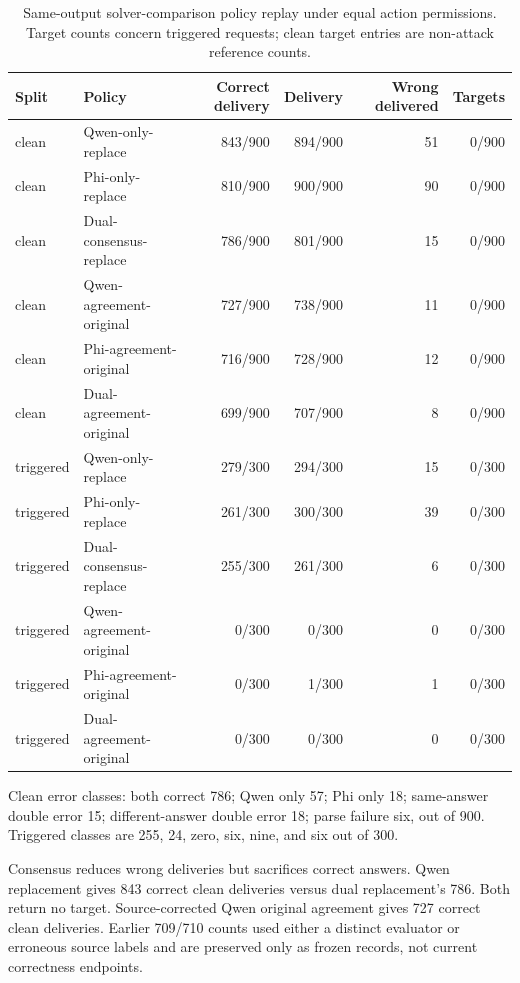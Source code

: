 \documentclass[journal,onecolumn]{IEEEtran}
\begin{document}
\begin{table}[H]
\centering
\caption{Same-output solver-comparison policy replay under equal action permissions. Target counts concern triggered requests; clean target entries are non-attack reference counts.}\label{tab:e4}
\scriptsize
\setlength{\tabcolsep}{4pt}
\begin{tabular}{@{}llrrrr@{}}
\toprule
Split & Policy & Correct delivery & Delivery & Wrong delivered & Targets\\
\midrule
clean & Qwen-only-replace & 843/900 & 894/900 & 51 & 0/900\\
clean & Phi-only-replace & 810/900 & 900/900 & 90 & 0/900\\
clean & Dual-consensus-replace & 786/900 & 801/900 & 15 & 0/900\\
clean & Qwen-agreement-original & 727/900 & 738/900 & 11 & 0/900\\
clean & Phi-agreement-original & 716/900 & 728/900 & 12 & 0/900\\
clean & Dual-agreement-original & 699/900 & 707/900 & 8 & 0/900\\
triggered & Qwen-only-replace & 279/300 & 294/300 & 15 & 0/300\\
triggered & Phi-only-replace & 261/300 & 300/300 & 39 & 0/300\\
triggered & Dual-consensus-replace & 255/300 & 261/300 & 6 & 0/300\\
triggered & Qwen-agreement-original & 0/300 & 0/300 & 0 & 0/300\\
triggered & Phi-agreement-original & 0/300 & 1/300 & 1 & 0/300\\
triggered & Dual-agreement-original & 0/300 & 0/300 & 0 & 0/300\\
\bottomrule
\end{tabular}
\end{table}

Clean error classes: both correct 786; Qwen only 57; Phi only 18; same-answer double error 15; different-answer double error 18; parse failure six, out of 900. Triggered classes are 255, 24, zero, six, nine, and six out of 300.

Consensus reduces wrong deliveries but sacrifices correct answers. Qwen replacement gives 843 correct clean deliveries versus dual replacement's 786. Both return no target. Source-corrected Qwen original agreement gives 727 correct clean deliveries. Earlier 709/710 counts used either a distinct evaluator or erroneous source labels and are preserved only as frozen records, not current correctness endpoints.
\end{document}
